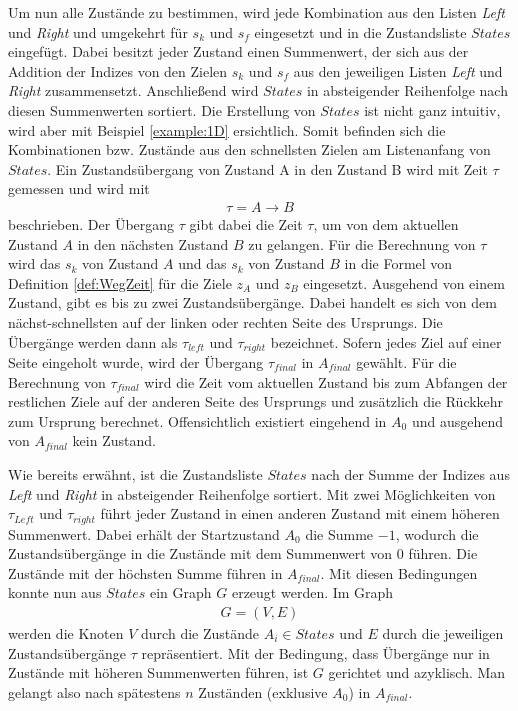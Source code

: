 \documentclass[german,version-2019-11]{uzl-thesis}
\begin{document}
Um nun alle Zustände zu bestimmen, wird jede Kombination aus den Listen \emph{Left} und \emph{Right} und umgekehrt für $s_k$ und $s_f$ eingesetzt und in die Zustandsliste $States$ eingefügt. Dabei besitzt jeder Zustand einen Summenwert, der sich aus der Addition der Indizes von den Zielen $s_k$ und $s_f$ aus den jeweiligen Listen \emph{Left} und \emph{Right} zusammensetzt. Anschließend wird $States$ in absteigender Reihenfolge nach diesen Summenwerten sortiert. Die Erstellung von $States$ ist nicht ganz intuitiv, wird aber mit Beispiel \ref{example:1D} ersichtlich. Somit befinden sich die Kombinationen bzw. Zustände aus den schnellsten Zielen am Listenanfang von $States$. Ein Zustandsübergang von Zustand A in den Zustand B wird mit Zeit $\tau$ gemessen und wird mit
\begin{align*}
\tau = A\rightarrow B
\end{align*}
beschrieben. Der Übergang $\tau$ gibt dabei die Zeit $\tau$, um von dem aktuellen Zustand $A$ in den nächsten Zustand $B$ zu gelangen. Für die Berechnung von $\tau$ wird das $s_k$ von Zustand $A$ und das $s_k$ von Zustand $B$ in die Formel von Definition \ref{def:WegZeit} für die Ziele $z_A$ und $z_B$ eingesetzt. Ausgehend von einem Zustand, gibt es bis zu zwei Zustandsübergänge. Dabei handelt es sich von dem nächst-schnellsten auf der linken oder rechten Seite des Ursprungs. Die Übergänge werden dann als $\tau_{left}$ und $\tau_{right}$ bezeichnet. Sofern jedes Ziel auf einer Seite eingeholt wurde, wird der Übergang $\tau_{final}$ in $A_{final}$ gewählt. Für die Berechnung von $\tau_{final}$ wird die Zeit vom aktuellen Zustand bis zum Abfangen der restlichen Ziele auf der anderen Seite des Ursprungs und zusätzlich die Rückkehr zum Ursprung berechnet. Offensichtlich existiert eingehend in $A_0$ und ausgehend von $A_{final}$ kein Zustand. 

Wie bereits erwähnt, ist die Zustandsliste $States$ nach der Summe der Indizes aus \emph{Left} und \emph{Right} in absteigender Reihenfolge sortiert. Mit zwei Möglichkeiten von $\tau_{Left}$ und $\tau_{right}$ führt jeder Zustand in einen anderen Zustand mit einem höheren Summenwert. Dabei erhält der Startzustand $A_0$ die Summe $-1$, wodurch die Zustandsübergänge in die Zustände mit dem Summenwert von $0$ führen. Die Zustände mit der höchsten Summe führen in $A_{final}$. Mit diesen Bedingungen konnte nun aus $States$ ein Graph $G$ erzeugt werden. Im Graph
\begin{align*}
G = (V,E)
\end{align*}
werden die Knoten $V$ durch die Zustände $A_i \in States$ und $E$ durch die jeweiligen Zustandsübergänge $\tau$ repräsentiert. Mit der Bedingung, dass Übergänge nur in Zustände mit höheren Summenwerten führen, ist $G$ gerichtet und azyklisch. Man gelangt also nach spätestens $n$ Zuständen (exklusive $A_0$) in $A_{final}$. 
\end{document}
